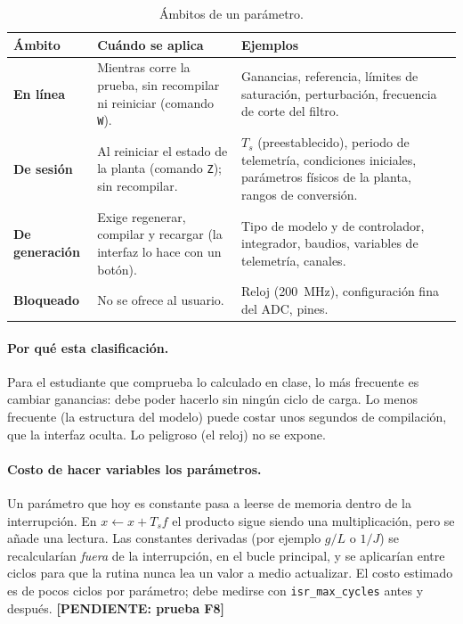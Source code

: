 \documentclass[12pt,letterpaper]{article}
\newcommand{\pendiente}[1]{\textbf{[PENDIENTE: #1]}}
\begin{document}
\begin{table}[!htbp]
\centering
\caption{Ámbitos de un parámetro.}
\label{tab:ambito}
\begin{tabularx}{\textwidth}{>{\raggedright\arraybackslash}p{2.7cm}YY}
\toprule
\textbf{Ámbito} & \textbf{Cuándo se aplica} & \textbf{Ejemplos} \\
\midrule
\textbf{En línea} & Mientras corre la prueba, sin recompilar ni reiniciar (comando \texttt{W}). & Ganancias, referencia, límites de saturación, perturbación, frecuencia de corte del filtro. \\
\textbf{De sesión} & Al reiniciar el estado de la planta (comando \texttt{Z}); sin recompilar. & $T_s$ (preestablecido), periodo de telemetría, condiciones iniciales, parámetros físicos de la planta, rangos de conversión. \\
\textbf{De generación} & Exige regenerar, compilar y recargar (la interfaz lo hace con un botón). & Tipo de modelo y de controlador, integrador, baudios, variables de telemetría, canales. \\
\textbf{Bloqueado} & No se ofrece al usuario. & Reloj (200~MHz), configuración fina del ADC, pines. \\
\bottomrule
\end{tabularx}
\end{table}

\paragraph{Por qué esta clasificación.} Para el estudiante que comprueba lo calculado en clase, lo más frecuente es cambiar ganancias: debe poder hacerlo sin ningún ciclo de carga. Lo menos frecuente (la estructura del modelo) puede costar unos segundos de compilación, que la interfaz oculta. Lo peligroso (el reloj) no se expone.

\paragraph{Costo de hacer variables los parámetros.} Un parámetro que hoy es constante pasa a leerse de memoria dentro de la interrupción. En $x \leftarrow x + T_s f$ el producto sigue siendo una multiplicación, pero se añade una lectura. Las constantes derivadas (por ejemplo $g/L$ o $1/J$) se recalcularían \emph{fuera} de la interrupción, en el bucle principal, y se aplicarían entre ciclos para que la rutina nunca lea un valor a medio actualizar. El costo estimado es de pocos ciclos por parámetro; debe medirse con \texttt{isr\_max\_cycles} antes y después. \pendiente{prueba F8}
\end{document}
